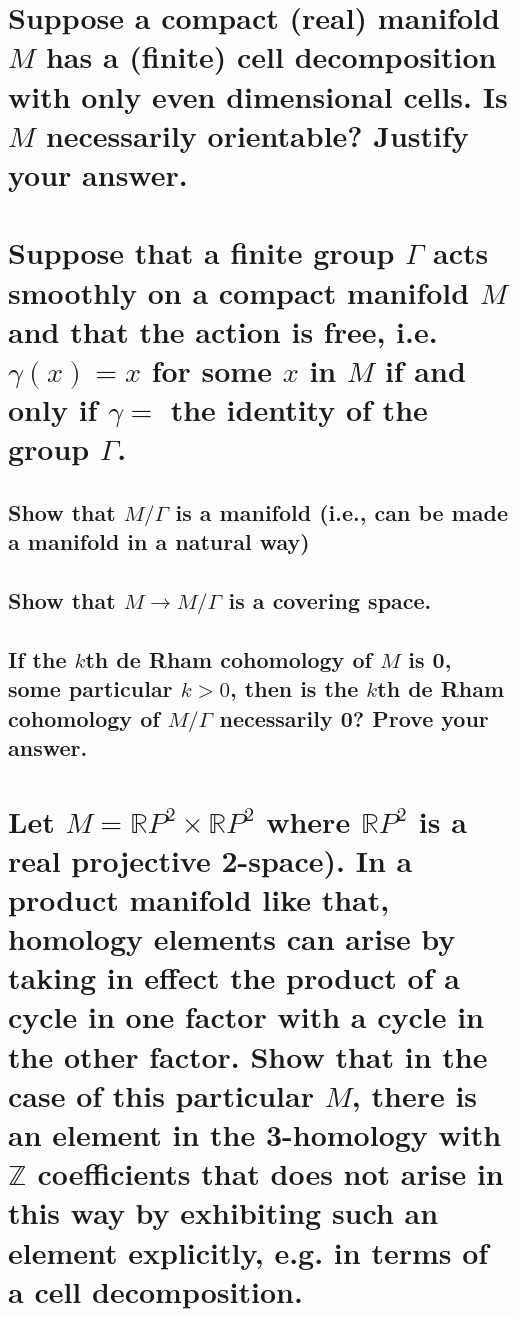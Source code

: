 \documentclass[10pt]{article}
\begin{document}
\section{Suppose a compact (real) manifold $M$ has a (finite) cell decomposition with only even
  dimensional cells. Is $M$ necessarily orientable? Justify your answer.}

\section{Suppose that a finite group $\Gamma$ acts smoothly on a compact manifold $M$ and that the
  action is free, i.e. $\gamma(x) = x$ for some $x$ in $M$ if and only if $\gamma =$ the identity of
  the group $\Gamma$.}

\subsection{Show that $M  / \Gamma$ is a manifold (i.e., can be made a manifold in a natural way)}

\subsection{Show that $M \to M / \Gamma$ is a covering space.}

\subsection{If the $k$th de Rham cohomology of $M$ is 0, some particular $k > 0$, then is the $k$th
  de Rham cohomology of $M / \Gamma$ necessarily 0? Prove your answer.}

\section{Let $M = \mathbb{R} P^2 \times \mathbb{R}P^2 $ where $\mathbb{R} P^2$ is a real projective
  2-space). In a product manifold like that, homology elements can arise by taking in effect the
  product of a cycle in one factor with a cycle in the other factor. Show that in the case of this
  particular $M$, there is an element in the 3-homology with $\mathbb{Z}$ coefficients that does not
  arise in this way by exhibiting such an element explicitly, e.g. in terms of a cell
  decomposition.}
\end{document}
